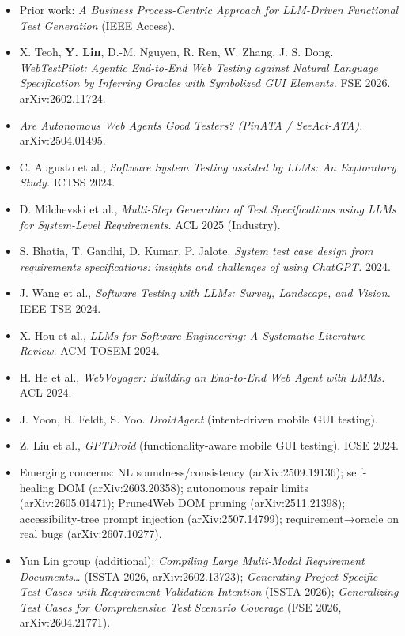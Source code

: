 \documentclass[
]{article}
\providecommand{\tightlist}{%
  \setlength{\itemsep}{0pt}\setlength{\parskip}{0pt}}
\begin{document}
\begin{itemize}
\tightlist
\item
  Prior work: \emph{A Business Process-Centric Approach for LLM-Driven
  Functional Test Generation} (IEEE Access).
\item
  X. Teoh, \textbf{Y. Lin}, D.-M. Nguyen, R. Ren, W. Zhang, J. S. Dong.
  \emph{WebTestPilot: Agentic End-to-End Web Testing against Natural
  Language Specification by Inferring Oracles with Symbolized GUI
  Elements.} FSE 2026. arXiv:2602.11724.
\item
  \emph{Are Autonomous Web Agents Good Testers? (PinATA / SeeAct-ATA).}
  arXiv:2504.01495.
\item
  C. Augusto et al., \emph{Software System Testing assisted by LLMs: An
  Exploratory Study.} ICTSS 2024.
\item
  D. Milchevski et al., \emph{Multi-Step Generation of Test
  Specifications using LLMs for System-Level Requirements.} ACL 2025
  (Industry).
\item
  S. Bhatia, T. Gandhi, D. Kumar, P. Jalote. \emph{System test case
  design from requirements specifications: insights and challenges of
  using ChatGPT.} 2024.
\item
  J. Wang et al., \emph{Software Testing with LLMs: Survey, Landscape,
  and Vision.} IEEE TSE 2024.
\item
  X. Hou et al., \emph{LLMs for Software Engineering: A Systematic
  Literature Review.} ACM TOSEM 2024.
\item
  H. He et al., \emph{WebVoyager: Building an End-to-End Web Agent with
  LMMs.} ACL 2024.
\item
  J. Yoon, R. Feldt, S. Yoo. \emph{DroidAgent} (intent-driven mobile GUI
  testing).
\item
  Z. Liu et al., \emph{GPTDroid} (functionality-aware mobile GUI
  testing). ICSE 2024.
\item
  Emerging concerns: NL soundness/consistency (arXiv:2509.19136);
  self-healing DOM (arXiv:2603.20358); autonomous repair limits
  (arXiv:2605.01471); Prune4Web DOM pruning (arXiv:2511.21398);
  accessibility-tree prompt injection (arXiv:2507.14799);
  requirement→oracle on real bugs (arXiv:2607.10277).
\item
  Yun Lin group (additional): \emph{Compiling Large Multi-Modal
  Requirement Documents\ldots{}} (ISSTA 2026, arXiv:2602.13723);
  \emph{Generating Project-Specific Test Cases with Requirement
  Validation Intention} (ISSTA 2026); \emph{Generalizing Test Cases for
  Comprehensive Test Scenario Coverage} (FSE 2026, arXiv:2604.21771).
\end{itemize}
\end{document}
